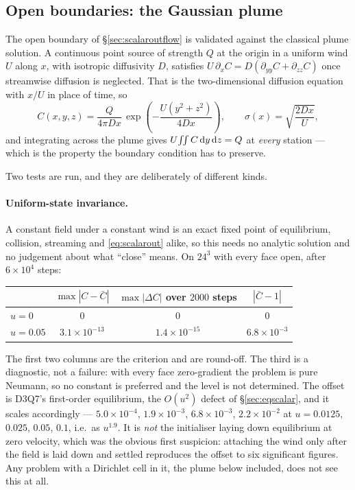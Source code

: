 \documentclass[11pt,a4paper]{article}
\begin{document}
\subsection{Open boundaries: the Gaussian plume}
\label{sec:plume}

The open boundary of \S\ref{sec:scalaroutflow} is validated against the
classical plume solution. A continuous point source of strength $Q$ at the
origin in a uniform wind $U$ along $x$, with isotropic diffusivity $D$,
satisfies $U\,\partial_x C = D(\partial_{yy}C + \partial_{zz}C)$ once
streamwise diffusion is neglected. That is the two-dimensional diffusion
equation with $x/U$ in place of time, so
\begin{equation}
  C(x,y,z) = \frac{Q}{4\pi D x}\,
             \exp\!\left(-\frac{U(y^2+z^2)}{4Dx}\right),
  \qquad \sigma(x) = \sqrt{\frac{2Dx}{U}} ,
  \label{eq:plume}
\end{equation}
and integrating across the plume gives $U\!\iint C\,{\rm d}y\,{\rm d}z = Q$ at
\emph{every} station --- which is the property the boundary condition has to
preserve.

Two tests are run, and they are deliberately of different kinds.

\paragraph{Uniform-state invariance.} A constant field under a constant wind is
an exact fixed point of equilibrium, collision, streaming and
\eqref{eq:scalarout} alike, so this needs no analytic solution and no judgement
about what ``close'' means. On $24^3$ with every face open, after $6\times10^4$
steps:
\begin{center}
\begin{tabular}{lccc}
\toprule
 & $\max|C-\bar{C}|$ & $\max|\Delta C|$ over $2000$ steps & $|\bar{C}-1|$ \\
\midrule
$u=0$    & $0$ & $0$ & $0$ \\
$u=0.05$ & $3.1\times10^{-13}$ & $1.4\times10^{-15}$ & $6.8\times10^{-3}$ \\
\bottomrule
\end{tabular}
\end{center}

\noindent The first two columns are the criterion and are round-off. The third
is a diagnostic, not a failure: with every face zero-gradient the problem is
pure Neumann, so no constant is preferred and the level is not determined. The
offset is D3Q7's first-order equilibrium, the $O(u^2)$ defect of
\S\ref{sec:eqscalar}, and it scales accordingly --- $5.0\times10^{-4}$,
$1.9\times10^{-3}$, $6.8\times10^{-3}$, $2.2\times10^{-2}$ at $u=0.0125$,
$0.025$, $0.05$, $0.1$, i.e.\ as $u^{1.9}$. It is \emph{not} the initialiser
laying down equilibrium at zero velocity, which was the obvious first
suspicion: attaching the wind only after the field is laid down and settled
reproduces the offset to six significant figures. Any problem with a Dirichlet
cell in it, the plume below included, does not see this at all.
\end{document}
